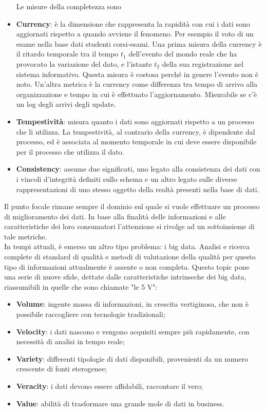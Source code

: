 \documentclass[a4paper,12pt]{article}
\begin{document}
\begin{itemize}
Le misure della completezza sono
\item \textbf{Currency}: è la dimensione che rappresenta la rapidità con cui i dati sono aggiornati rispetto a quando avviene il fenomeno. Per esempio il voto di un esame nella base dati studenti corsi-esami. Una prima misura della currency è il ritardo temporale tra il tempo $t_1$ dell'evento del mondo reale che ha provocato la variazione del dato, e l'istante $t_2$ della sua registrazione nel sistema informativo. Questa misura è costosa perché in genere l'evento non è noto. Un'altra metrica è la currency come differenza tra tempo di arrivo alla organizzazione e tempo in cui è effettuato l'aggiornamento. Misurabile se c'è un log degli arrivi degli update.
\item \textbf{Tempestività}: misura quanto i dati sono aggiornati rispetto a un processo che li utilizza. La tempestività, al contrario della currency, è dipendente dal processo, ed è associata al momento temporale in cui deve essere disponibile per il processo che utilizza il dato.
\item \textbf{Consistency}: assume due significati, uno legato alla consistenza dei dati con i vincoli d'integrità definiti sullo schema e un altro legato sulle diverse rappresentazioni di uno stesso oggetto della realtà presenti nella base di dati.
\end{itemize} 

\bigskip

\noindent Il punto focale rimane sempre il dominio sul quale si vuole effettuare un processo di miglioramento dei dati. In base alla finalità delle informazioni e alle caratteristiche dei loro consumatori l'attenzione si rivolge ad un sottoinsieme di tale metriche.\\

\noindent In tempi attuali, è emerso un altro tipo problema: i big data. Analisi e ricerca complete di standard di qualità e metodi di valutazione della qualità per questo tipo di informazioni attualmente è assente o non completa. Questo topic pone una serie di nuove sfide, dettate dalle caratteristiche intrinseche dei big data, riassumibili in quelle che sono chiamate "le 5 V":
\begin{itemize}
	\item \textbf{Volume}: ingente massa di informazioni, in crescita vertiginosa, che non è possibile raccogliere con tecnologie tradizionali;
	\item \textbf{Velocity}: i dati nascono e vengono acquisiti sempre più rapidamente, con necessità di analisi in tempo reale;
	\item \textbf{Variety}: differenti tipologie di dati disponibili, provenienti da un numero crescente di fonti eterogenee;
	\item \textbf{Veracity}: i dati devono essere affidabili, raccontare il vero;
	\item \textbf{Value}: abilità di trasformare una grande mole di dati in business.
\end{itemize}
\end{document}
